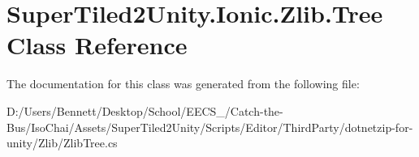 \hypertarget{class_super_tiled2_unity_1_1_ionic_1_1_zlib_1_1_tree}{}\section{Super\+Tiled2\+Unity.\+Ionic.\+Zlib.\+Tree Class Reference}
\label{class_super_tiled2_unity_1_1_ionic_1_1_zlib_1_1_tree}


The documentation for this class was generated from the following file\+:\begin{DoxyCompactItemize}
\item 
D\+:/\+Users/\+Bennett/\+Desktop/\+School/\+E\+E\+C\+S\+\_/\+Catch-\/the-\/\+Bus/\+Iso\+Chai/\+Assets/\+Super\+Tiled2\+Unity/\+Scripts/\+Editor/\+Third\+Party/dotnetzip-\/for-\/unity/\+Zlib/Zlib\+Tree.\+cs\end{DoxyCompactItemize}
